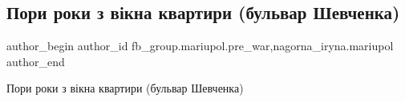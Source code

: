  
 
 
 
 

\subsection{Пори роки з вікна квартири (бульвар Шевченка)}
\label{sec:09_02_2023.fb.fb_group.mariupol.pre_war.4.pori_roki_z_v_kna_kv}
 
\ifcmt
 author_begin
   author_id fb_group.mariupol.pre_war,nagorna_iryna.mariupol
 author_end
\fi

Пори роки з вікна квартири (бульвар Шевченка)

